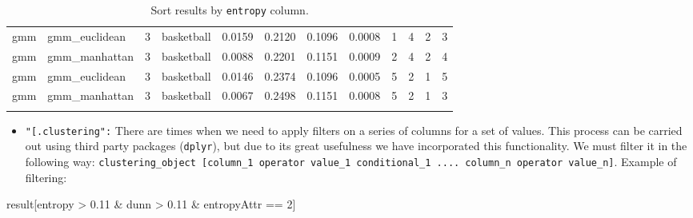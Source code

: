 \documentclass[
]{article}
\newenvironment{Shaded}{\begin{snugshade}}{\end{snugshade}}
\newcommand{\DecValTok}[1]{\textcolor[rgb]{0.00,0.00,0.81}{#1}}
\newcommand{\FloatTok}[1]{\textcolor[rgb]{0.00,0.00,0.81}{#1}}
\newcommand{\NormalTok}[1]{#1}
\newcommand{\SpecialCharTok}[1]{\textcolor[rgb]{0.00,0.00,0.00}{#1}}
\providecommand{\tightlist}{%
  \setlength{\itemsep}{0pt}\setlength{\parskip}{0pt}}
\begin{document}
\begin{longtable}{| p{1.1cm} | p{2cm} | p{0.8cm} | p{1.3cm} | p{0.60cm} | p{0.7cm} | p{0.65cm} | p{0.65cm} | p{0.65cm} | p{0.65cm} | p{0.7cm} | p{0.65cm} |}
\cline{2-12}
\scriptsize      gmm     & \scriptsize  gmm\_euclidean & \scriptsize    3     & \scriptsize basketball & \scriptsize    0.0159    & \scriptsize 0.2120  & \scriptsize 0.1096 & \scriptsize    0.0008    & \scriptsize        1         & \scriptsize     4       & \scriptsize      2    & \scriptsize        3 \\
\cline{2-12}
\scriptsize      gmm     & \scriptsize  gmm\_manhattan & \scriptsize    3     & \scriptsize basketball & \scriptsize    0.0088    & \scriptsize 0.2201  & \scriptsize 0.1151 & \scriptsize    0.0009    & \scriptsize        2         & \scriptsize     4       & \scriptsize      2    & \scriptsize        4 \\
\cline{2-12}
\scriptsize      gmm     & \scriptsize  gmm\_euclidean & \scriptsize    3     & \scriptsize basketball & \scriptsize    0.0146    & \scriptsize 0.2374  & \scriptsize 0.1096 & \scriptsize    0.0005    & \scriptsize        5         & \scriptsize     2       & \scriptsize      1    & \scriptsize        5 \\
\cline{2-12}
\scriptsize      gmm     & \scriptsize  gmm\_manhattan & \scriptsize    3     & \scriptsize basketball & \scriptsize    0.0067    & \scriptsize 0.2498  & \scriptsize 0.1151 & \scriptsize    0.0008    & \scriptsize        5         & \scriptsize     2       & \scriptsize      1    & \scriptsize        3 \\
\hline
\caption{Sort results by \texttt{entropy} column.}
\label{tab:resultsorting}
\end{longtable}

\begin{itemize}
\tightlist
\item
  \texttt{"[.clustering":} There are times when we need to apply filters
  on a series of columns for a set of values. This process can be
  carried out using third party packages (\texttt{dplyr}), but due to
  its great usefulness we have incorporated this functionality. We must
  filter it in the following way:
  \texttt{clustering\_object [column\_1 operator value\_1 conditional\_1 .... column\_n operator value\_n]}.
  Example of filtering:
\end{itemize}

\begin{Shaded}
\begin{Highlighting}[]
\NormalTok{result[entropy }\SpecialCharTok{\textgreater{}} \FloatTok{0.11} \SpecialCharTok{\&}\NormalTok{ dunn }\SpecialCharTok{\textgreater{}} \FloatTok{0.11} \SpecialCharTok{\&}\NormalTok{ entropyAttr }\SpecialCharTok{==} \DecValTok{2}\NormalTok{]}
\end{Highlighting}
\end{Shaded}
\end{document}
